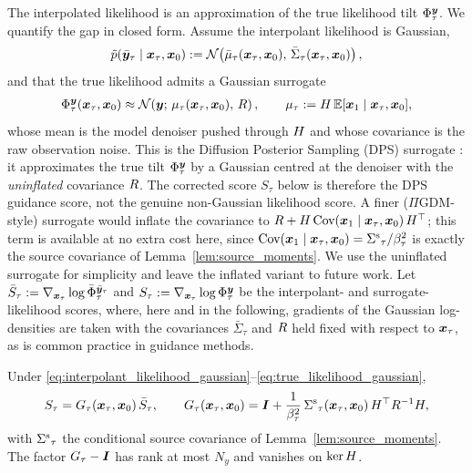 The interpolated likelihood is an approximation of the true likelihood tilt $\Phi_\tau^{\boldsymbol{y}}$. We quantify the gap in closed form. Assume the interpolant likelihood is Gaussian,
\begin{align}\label{eq:interpolant_likelihood_gaussian}
    \tilde{p}(\bar{\boldsymbol{y}}_\tau \mid \boldsymbol{x}_\tau, \boldsymbol{x}_0)
    := \mathcal{N}\!\left(\bar{\mu}_\tau(\boldsymbol{x}_\tau, \boldsymbol{x}_0),\, \bar{\Sigma}_\tau(\boldsymbol{x}_\tau, \boldsymbol{x}_0)\right),
\end{align}
and that the true likelihood admits a Gaussian surrogate
\begin{align}\label{eq:true_likelihood_gaussian}
    \Phi_{\tau}^{\boldsymbol{y}}(\boldsymbol{x}_\tau, \boldsymbol{x}_0)
    \approx \mathcal{N}\!\left(\boldsymbol{y};\, \mu_\tau(\boldsymbol{x}_\tau, \boldsymbol{x}_0),\, R\right),
    \qquad
    \mu_\tau := H\,\mathbb{E}[\boldsymbol{x}_1 \mid \boldsymbol{x}_\tau, \boldsymbol{x}_0],
\end{align}
whose mean is the model denoiser pushed through $H$ and whose covariance is the raw observation noise. This is the Diffusion Posterior Sampling (DPS) surrogate \cite{chung_diffusion_2023, chung_improving_2024, song_score-based_2021}: it approximates the true tilt $\Phi_\tau^{\boldsymbol{y}}$ by a Gaussian centred at the denoiser with the \emph{uninflated} covariance $R$. The corrected score $S_\tau$ below is therefore the DPS guidance score, not the genuine non-Gaussian likelihood score. A finer (\(\Pi\)GDM-style) surrogate \cite{song_pseudoinverse_2023} would inflate the covariance to $R + H\,\text{Cov}(\boldsymbol{x}_1\mid\boldsymbol{x}_\tau,\boldsymbol{x}_0)\,H^\top$; this term is available at no extra cost here, since $\text{Cov}(\boldsymbol{x}_1\mid\boldsymbol{x}_\tau,\boldsymbol{x}_0)={\Sigma^{\mathrm{s}}}_\tau/\beta_\tau^2$ is exactly the source covariance of Lemma~\ref{lem:source_moments}. We use the uninflated surrogate for simplicity and leave the inflated variant to future work. Let $\bar{S}_\tau := \nabla_{\boldsymbol{x}_\tau} \log \bar{\Phi}_{\tau}^{\bar{\boldsymbol{y}}_\tau}$ and $S_\tau := \nabla_{\boldsymbol{x}_\tau} \log \Phi_{\tau}^{\boldsymbol{y}}$ be the interpolant- and surrogate-likelihood scores, where, here and in the following, gradients of the Gaussian log-densities are taken with the covariances $\bar{\Sigma}_\tau$ and $R$ held fixed with respect to $\boldsymbol{x}_\tau$, as is common practice in guidance methods.

\begin{theorem}\label{thm:multiplicative_correction}
Under \eqref{eq:interpolant_likelihood_gaussian}--\eqref{eq:true_likelihood_gaussian},
\begin{align}\label{eq:multiplicative_correction}
    S_\tau = G_\tau(\boldsymbol{x}_\tau, \boldsymbol{x}_0)\, \bar{S}_\tau,
    \qquad
    G_\tau(\boldsymbol{x}_\tau, \boldsymbol{x}_0)
    = \bm{I} + \frac{1}{\beta_\tau^2}\,
      {\Sigma^{\mathrm{s}}}_\tau(\boldsymbol{x}_\tau, \boldsymbol{x}_0)\,
      H^\top R^{-1} H,
\end{align}
with ${\Sigma^{\mathrm{s}}}_\tau$ the conditional source covariance of Lemma~\ref{lem:source_moments}. The factor $G_\tau - \bm{I}$ has rank at most $N_y$ and vanishes on $\ker H$.
\end{theorem}

